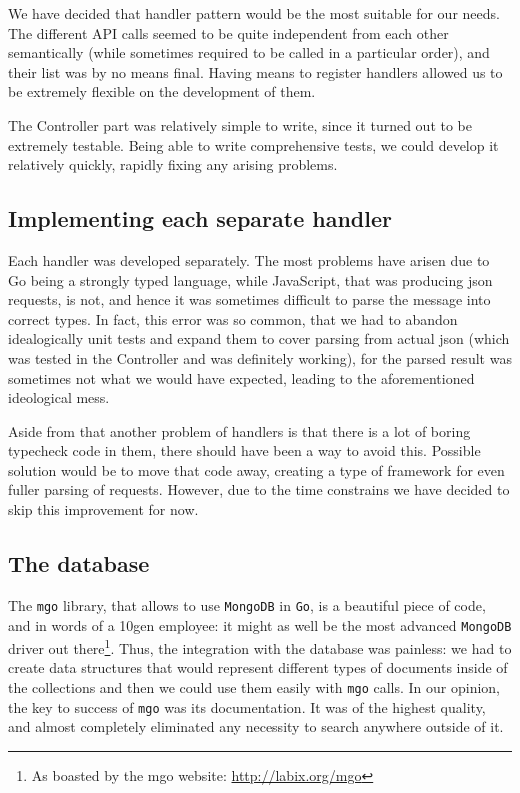 \documentclass{l3proj}
\begin{document}
We have decided that handler pattern would be the most suitable for our needs. The different API calls seemed to be quite independent from each other semantically (while sometimes required to be called in a particular order), and their list was by no means final. Having means to register handlers allowed us to be extremely flexible on the development of them.

The Controller part was relatively simple to write, since it turned out to be extremely testable. Being able to write comprehensive tests, we could develop it relatively quickly, rapidly fixing any arising problems. 

\subsection{Implementing each separate handler}

Each handler was developed separately. The most problems have arisen due to Go being a strongly typed language, while JavaScript, that was producing json requests, is not, and hence it was sometimes difficult to parse the message into correct types. In fact, this error was so common, that we had to abandon idealogically unit tests and expand them to cover parsing from actual json (which was tested in the Controller and was definitely working), for the parsed result was sometimes not what we would have expected, leading to the aforementioned ideological mess.

Aside from that another problem of handlers is that there is a lot of boring typecheck code in them, there should have been a way to avoid this. Possible solution would be to move that code away, creating a type of framework for even fuller parsing of requests. However, due to the time constrains we have decided to skip this improvement for now.

\subsection{The database}

The \texttt{mgo} library, that allows to use \texttt{MongoDB} in \texttt{Go}, is a beautiful piece of code, and in words of a 10gen employee: it might as well be the most advanced \texttt{MongoDB} driver out there\footnote{\raggedright{}As boasted by the mgo website: \url{http://labix.org/mgo}}. Thus, the integration with the database was painless: we had to create data structures that would represent different types of documents inside of the collections and then we could use them easily with \texttt{mgo} calls. In our opinion, the key to success of \texttt{mgo} was its documentation. It was of the highest quality, and almost completely eliminated any necessity to search anywhere outside of it.
\end{document}
